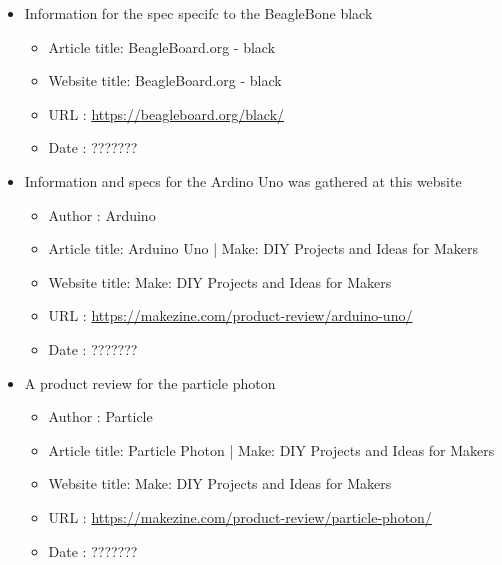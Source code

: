 \documentclass{article}
\begin{document}
\begin{thebibliography}{56}
\begin{itemize}
        \item Information for the spec specifc to the BeagleBone black
        \begin{itemize}
            \item Article title: BeagleBoard.org - black
            \item Website title: BeagleBoard.org - black
            \item URL          : \url{https://beagleboard.org/black/}
            \item Date         : ???????
        \end{itemize}

    \end{itemize}

    \begin{itemize}
        \item Information and specs for the Ardino Uno was gathered at this website
        \begin{itemize}
            \item Author       : Arduino
            \item Article title: Arduino Uno | Make: DIY Projects and Ideas for Makers
            \item Website title: Make: DIY Projects and Ideas for Makers
            \item URL          : \url{https://makezine.com/product-review/arduino-uno/}
            \item Date         : ???????
        \end{itemize}
    \end{itemize}

    \begin{itemize}
        \item A product review for the particle photon
        \begin{itemize}
            \item Author       : Particle
            \item Article title: Particle Photon | Make: DIY Projects and Ideas for Makers
            \item Website title: Make: DIY Projects and Ideas for Makers
            \item URL          : \url{https://makezine.com/product-review/particle-photon/}
            \item Date         : ???????
        \end{itemize}


\end{itemize}
\end{thebibliography}
\end{document}
